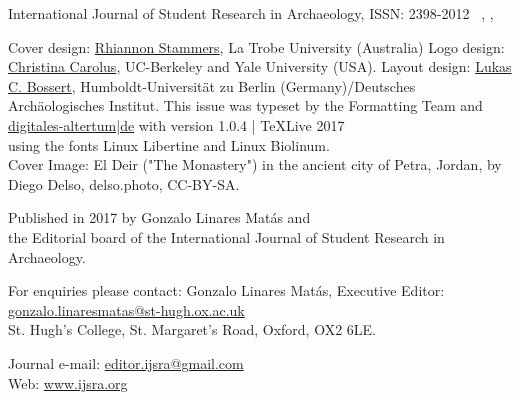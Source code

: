 \IJSRAtitlepage
\clearpage
\mypagesize
\thispagestyle{empty}
\hfill
\vfill

\begin{footnotesize}

\noindent International Journal of Student Research in Archaeology,\newline
ISSN: 2398-2012\newline
\IJSRAmonth\ \IJSRAyear , \IJSRAvolume , \IJSRAnumber\\
\vspace{2em}


\noindent Cover design: \href{https://latrobe.academia.edu/RhiannonStammers}{Rhiannon Stammers}, La Trobe University (Australia)\newline
\noindent Logo design: \href{https://hraf.yale.edu/about/staff/christina-carolus/}{Christina Carolus}, UC-Berkeley and Yale University (USA).\newline
\noindent Layout design: \href{https://dainst.academia.edu/LukasCBossert}{Lukas C. Bossert}, Humboldt-Universität zu Berlin (Germany)/Deutsches Archäologisches Institut. \newline \indent This issue was typeset by the Formatting Team and \href{www.digitales-altertum.de}{digitales-altertum|de}  with  version 1.0.4 | \TeX Live 2017 \\ \indent using the fonts Linux Libertine and {\sffamily Linux Biolinum}.\\
Cover Image: 
El Deir ("The Monastery") in the ancient city of Petra, Jordan, by Diego Delso, delso.photo, CC-BY-SA.\\
\vspace{2em}

\noindent Published in 2017 by Gonzalo Linares Matás and \\ the Editorial board of the International Journal of Student Research in Archaeology. 




\vspace{2em}






\noindent For enquiries please contact: Gonzalo Linares Matás, Executive Editor:\\ \href{mailto:gonzalo.linaresmatas@st-hugh.ox.ac.uk}{gonzalo.linaresmatas@st-hugh.ox.ac.uk}\\  St. Hugh’s College, St. Margaret’s Road, Oxford, OX2 6LE.

\noindent Journal e-mail: \href{mailto:editor.ijsra@gmail.com}{editor.ijsra@gmail.com}\\
\noindent Web: \href{http://www.ijsra.org}{www.ijsra.org}


\end{footnotesize}
